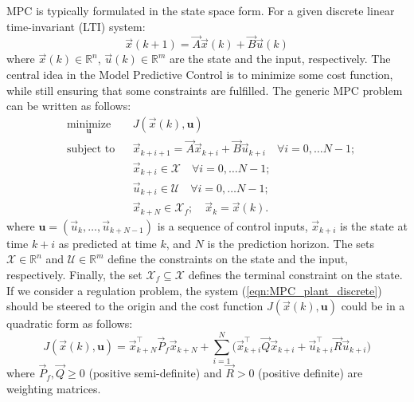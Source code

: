 MPC is typically formulated in the state space form. For a given discrete linear time-invariant (LTI) system:
\begin{equation}
\label{eqn:MPC_plant_discrete}
\vec{x}(k+1)=\vec{A}\vec{x}(k)+ \vec{B} \vec{u}(k)
\end{equation}
where $\vec{x}(k)\in\mathbb{R}^n$, $\vec{u}(k)\in\mathbb{R}^m$ are the state and the input, respectively. The central idea in the Model Predictive Control is to minimize some cost function, while still ensuring that some constraints are fulfilled. The generic MPC problem can be written as follows:
\begin{equation}
\label{eqn:MPC_optimization}
\begin{aligned}
& \underset{\textbf{u}}{\text{minimize}}
& & J(\vec{x}(k), \textbf{u}) \\
& \text{subject to}
& & \vec{x}_{k+i+1} = \vec{A}\vec{x}_{k+i}+ \vec{B} \vec{u}_{k+i}\quad\forall i=0,\dots N-1;\\
& & & \vec{x}_{k+i}\in \mathcal{X}\quad\forall i=0,\dots N-1;\\
& & & \vec{u}_{k+i}\in \mathcal{U}\quad\forall i=0,\dots N-1;\\  
& & & \vec{x}_{k+N}\in \mathcal{X}_f;\quad\vec{x}_k = \vec{x}(k).
\end{aligned}
\end{equation}
where $\textbf{u}=(\vec{u}_k,\dots,\vec{u}_{k+N-1})$ is a sequence of control inputs, $\vec{x}_{k+i}$ is the state at time $k+i$ as predicted at time $k$, and $N$ is the prediction horizon. The sets $\mathcal{X}\in\mathbb{R}^n$ and $\mathcal{U}\in\mathbb{R}^m$ define the constraints on the state and the input, respectively. Finally, the set $\mathcal{X}_f\subseteq\mathcal{X}$ defines the terminal constraint on the state. If we consider a regulation problem, the system (\ref{eqn:MPC_plant_discrete}) should be steered to the origin and the cost function $J(\vec{x}(k), \textbf{u})$ could be in a quadratic form as follows:
\begin{equation}
\label{eqn:MPC_cost_function_regulation}
	J(\vec{x}(k), \textbf{u}) = \vec{x}^\intercal_{k+N}\vec{P}_f\vec{x}_{k+N}+\sum_{i=1}^{N}\Big(\vec{x}^\intercal_{k+i}\vec{Q}\vec{x}_{k+i}+\vec{u}_{k+i}^\intercal\vec{R}\vec{u}_{k+i}\Big)
\end{equation}
where $\vec{P}_f,\vec{Q}\geq0$ (positive semi-definite) and $\vec{R}>0$ (positive definite) are weighting matrices.

